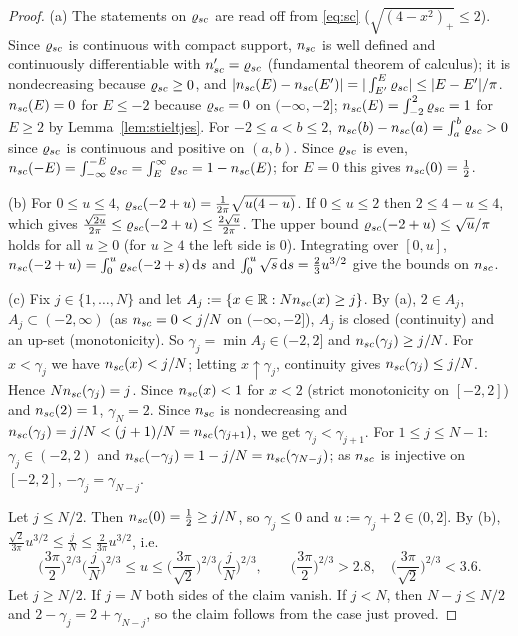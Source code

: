\begin{proof}
(a) The statements on $\varrho_{sc}$ are read off from \eqref{eq:sc} ($\sqrt{(4-x^2)_+}\le2$). Since $\varrho_{sc}$ is continuous with compact support, $n_{sc}$ is well defined and continuously differentiable with $n_{sc}'=\varrho_{sc}$ (fundamental theorem of calculus);
it is nondecreasing because $\varrho_{sc}\ge0$, and $|n_{sc}(E)-n_{sc}(E')|=|\int_{E'}^E\varrho_{sc}|\le|E-E'|/\pi$. $n_{sc}(E)=0$ for $E\le-2$ because $\varrho_{sc}=0$ on $(-\infty,-2]$; $n_{sc}(E)=\int_{-2}^2\varrho_{sc}=1$ for $E\ge2$ by Lemma~\ref{lem:stieltjes}.
For $-2\le a<b\le2$, $n_{sc}(b)-n_{sc}(a)=\int_a^b\varrho_{sc}>0$ since $\varrho_{sc}$ is continuous and positive on $(a,b)$. Since $\varrho_{sc}$ is even, $n_{sc}(-E)=\int_{-\infty}^{-E}\varrho_{sc}=\int_E^\infty\varrho_{sc}=1-n_{sc}(E)$; for $E=0$ this gives $n_{sc}(0)=\frac12$.

(b) For $0\le u\le4$, $\varrho_{sc}(-2+u)=\frac1{2\pi}\sqrt{u(4-u)}$. If $0\le u\le2$ then $2\le4-u\le4$, which gives $\frac{\sqrt{2u}}{2\pi}\le\varrho_{sc}(-2+u)\le\frac{2\sqrt u}{2\pi}$. The upper bound $\varrho_{sc}(-2+u)\le\sqrt u/\pi$ holds for all $u\ge0$ (for $u\ge4$ the left side is $0$).
Integrating over $[0,u]$, $n_{sc}(-2+u)=\int_0^u\varrho_{sc}(-2+s)\,\mathrm{d} s$ and $\int_0^u\sqrt s\,\mathrm{d} s=\frac23u^{3/2}$ give the bounds on $n_{sc}$.

(c) Fix $j\in\{1,\dots,N\}$ and let $A_j:=\{x\in\mathbb{R}:Nn_{sc}(x)\ge j\}$. By (a), $2\in A_j$, $A_j\subset(-2,\infty)$ (as $n_{sc}=0<j/N$ on $(-\infty,-2]$), $A_j$ is closed (continuity) and an up-set (monotonicity). So $\gamma_j=\min A_j\in(-2,2]$ and $n_{sc}(\gamma_j)\ge j/N$.
For $x<\gamma_j$ we have $n_{sc}(x)<j/N$; letting $x\uparrow\gamma_j$, continuity gives $n_{sc}(\gamma_j)\le j/N$. Hence $Nn_{sc}(\gamma_j)=j$.
Since $n_{sc}(x)<1$ for $x<2$ (strict monotonicity on $[-2,2]$) and $n_{sc}(2)=1$, $\gamma_N=2$. Since $n_{sc}$ is nondecreasing and $n_{sc}(\gamma_j)=j/N<(j+1)/N=n_{sc}(\gamma_{j+1})$, we get $\gamma_j<\gamma_{j+1}$.
For $1\le j\le N-1$: $\gamma_j\in(-2,2)$ and $n_{sc}(-\gamma_j)=1-j/N=n_{sc}(\gamma_{N-j})$; as $n_{sc}$ is injective on $[-2,2]$, $-\gamma_j=\gamma_{N-j}$.

Let $j\le N/2$. Then $n_{sc}(0)=\frac12\ge j/N$, so $\gamma_j\le0$ and $u:=\gamma_j+2\in(0,2]$. By (b), $\frac{\sqrt2}{3\pi}u^{3/2}\le\frac jN\le\frac2{3\pi}u^{3/2}$, i.e.
\[
 \Big(\frac{3\pi}2\Big)^{2/3}\Big(\frac jN\Big)^{2/3}\le u\le\Big(\frac{3\pi}{\sqrt2}\Big)^{2/3}\Big(\frac jN\Big)^{2/3},\qquad\Big(\frac{3\pi}2\Big)^{2/3}>2.8,\quad\Big(\frac{3\pi}{\sqrt2}\Big)^{2/3}<3.6 .
\]
Let $j\ge N/2$. If $j=N$ both sides of the claim vanish. If $j<N$, then $N-j\le N/2$ and $2-\gamma_j=2+\gamma_{N-j}$, so the claim follows from the case just proved.


\end{proof}
